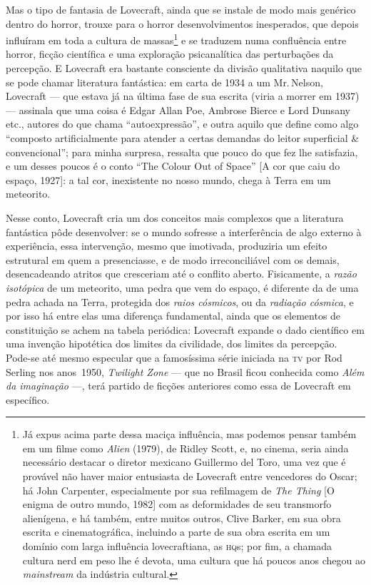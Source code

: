 Mas o tipo de fantasia de Lovecraft, ainda que se instale de modo mais
genérico dentro do horror, trouxe para o horror desenvolvimentos
inesperados, que depois influíram em toda a cultura de massas\footnote{Já
  expus acima parte dessa maciça influência, mas podemos pensar também
  em um filme como \emph{Alien} (1979), de Ridley Scott, e, no cinema,
  seria ainda necessário destacar o diretor mexicano Guillermo del Toro, uma vez que é provável não haver maior entusiasta de Lovecraft
  entre vencedores do Oscar; há John Carpenter, especialmente por
  sua refilmagem de \emph{The Thing} [O enigma de outro mundo, 1982] com as deformidades de seu
  transmorfo alienígena, e há também, entre muitos outros, Clive Barker, em sua obra escrita e cinematográfica, incluindo a parte de
  sua obra escrita em um domínio com larga influência lovecraftiana, as
  \textsc{hq}s; por fim, a chamada cultura nerd em peso lhe é devota, uma
  cultura que há poucos anos chegou ao \emph{mainstream} da indústria
  cultural.} e se traduzem numa confluência entre horror, ficção
científica e uma exploração psicanalítica das perturbações da percepção.
E Lovecraft era bastante consciente da divisão qualitativa naquilo que
se pode chamar literatura fantástica: em carta de 1934 a um Mr.\,Nelson, Lovecraft --- que estava já na última fase de sua escrita (viria
a morrer em 1937) --- assinala que uma coisa é Edgar Allan Poe, Ambrose
Bierce e Lord Dunsany etc., autores do que
chama ``autoexpressão'', e outra aquilo que define como algo ``composto
artificialmente para atender a certas demandas do leitor superficial \&
convencional''; para minha surpresa, ressalta que pouco do que fez lhe
satisfazia, e um desses poucos é o conto ``The Colour Out of Space'' [A
cor que caiu do espaço, 1927]: a tal cor, inexistente no nosso mundo,
chega à Terra em um meteorito.

Nesse conto, Lovecraft cria um dos conceitos mais complexos que a
literatura fantástica pôde desenvolver: se o mundo sofresse a
interferência de algo externo à experiência, essa intervenção, mesmo que
imotivada, produziria um efeito estrutural em quem a presenciasse, e de
modo irreconciliável com os demais, desencadeando atritos que cresceriam
até o conflito aberto. Fisicamente, a \emph{razão isotópica} de um
meteorito, uma pedra que vem do espaço, é diferente da de uma pedra
achada na Terra, protegida dos \emph{raios cósmicos}, ou da
\emph{radiação cósmica}, e por isso há entre elas uma diferença
fundamental, ainda que os elementos de constituição se achem na tabela
periódica: Lovecraft expande o dado científico em uma invenção
hipotética dos limites da civilidade, dos limites da percepção. Pode-se
até mesmo especular que a famosíssima série iniciada na \textsc{tv} por Rod
Serling nos anos~1950, \emph{Twilight Zone} --- que no Brasil ficou
conhecida como \emph{Além da imaginação} ---, terá partido de
ficções anteriores como essa de Lovecraft em específico.

